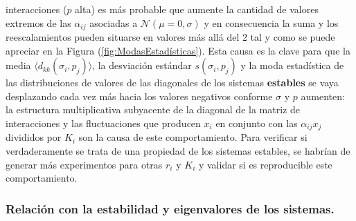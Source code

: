interacciones ($p$ alta) es más probable que aumente la cantidad de valores extremos de las $\alpha_{ij}$ asociadas a $\mathcal{N}(\mu=0,\sigma)$ y en consecuencia la suma y los reescalamientos pueden situarse en valores más allá del 2 tal y como se puede apreciar en la Figura (\ref{fig:ModasEstadísticas}). Esta causa es la clave para que la media $\langle d_{kk}(\sigma_i,p_j)\rangle$, la desviación estándar $s(\sigma_i,p_j)$ y la moda estadística de las distribuciones de valores de las diagonales de los sistemas \textbf{estables} se vaya desplazando cada vez más hacia los valores negativos conforme $\sigma$ y $p$ aumenten: la estructura multiplicativa subyacente de la diagonal de la matriz de interacciones y las fluctuaciones que producen $x_i$ en conjunto con las $\alpha_{ij}x_j$ divididos por $K_i$ son la causa de este comportamiento. Para verificar si verdaderamente se trata de una propiedad de los sistemas estables, se habrían de generar más experimentos para otras $r_i$ y $K_i$ y validar si es reproducible este comportamiento. 

\subsubsection*{Relación con la estabilidad y eigenvalores de los sistemas.}

